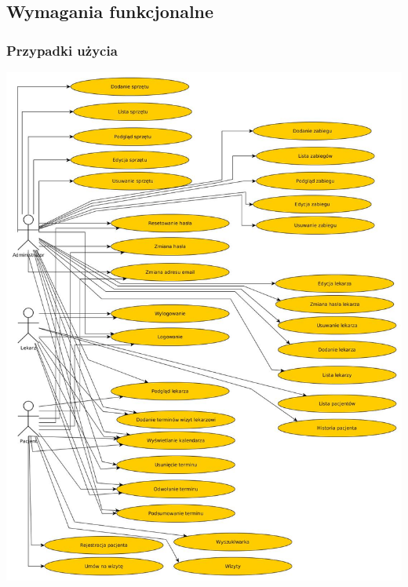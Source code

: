 \subsection{Wymagania funkcjonalne}





\subsubsection{Przypadki użycia}

\includegraphics[scale=0.4]{graphs/przypadki_uzycia.jpg}
